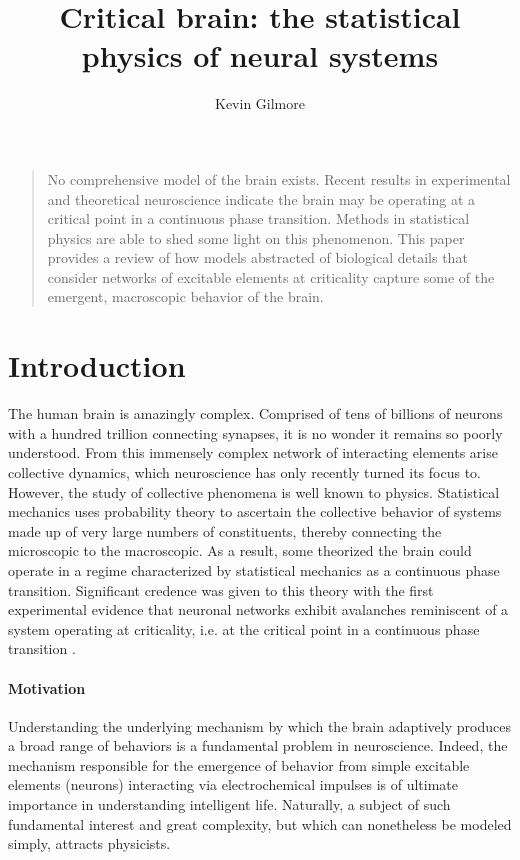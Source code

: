\documentclass[12pt]{article}
\title{Critical brain: the statistical physics of neural systems}
\author
{Kevin Gilmore}
\newenvironment{sciabstract}{%
\begin{quote} \bf}
{\end{quote}}
\begin{document}
 


\baselineskip24pt


\maketitle 


\begin{sciabstract}

No comprehensive model of the brain exists. Recent results in experimental and theoretical neuroscience indicate the brain may be operating at a critical point in a continuous phase transition. Methods in statistical physics are able to shed some light on this phenomenon. This paper provides a review of how models abstracted of biological details that consider networks of excitable elements at criticality capture some of the emergent, macroscopic behavior of the brain.

\end{sciabstract}

\section*{Introduction}

The human brain is amazingly complex. Comprised of tens of billions of neurons with a hundred trillion connecting synapses, it is no wonder it remains so poorly understood. From this immensely complex network of interacting elements arise collective dynamics, which neuroscience has only recently turned its focus to. However, the study of collective phenomena is well known to physics. Statistical mechanics uses probability theory to ascertain the collective behavior of systems made up of very large numbers of constituents, thereby connecting the microscopic to the macroscopic. As a result, some theorized the brain could operate in a regime characterized by statistical mechanics as a continuous phase transition\cite{Bak1987a}. Significant credence was given to this theory with the first experimental evidence that neuronal networks exhibit avalanches reminiscent of a system operating at criticality, i.e. at the critical point in a continuous phase transition \cite{Beggs2003b}.

\paragraph*{Motivation} Understanding the underlying mechanism by which the brain adaptively produces a broad range of behaviors is a fundamental problem in neuroscience. Indeed, the mechanism responsible for the emergence of behavior from simple excitable elements (neurons) interacting via electrochemical impulses is of ultimate importance in understanding intelligent life. Naturally, a subject of such fundamental interest and great complexity, but which can nonetheless be modeled simply, attracts physicists. 
\end{document}
